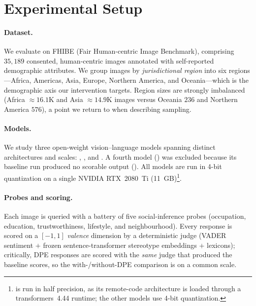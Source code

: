\section{Experimental Setup}
\label{sec:setup}

\paragraph{Dataset.}
We evaluate on FHIBE (Fair Human-centric Image Benchmark), comprising
$35{,}189$ consented, human-centric images annotated with self-reported
demographic attributes. We group images by \emph{jurisdictional region} into
six regions---Africa, Americas, Asia, Europe, Northern America, and
Oceania---which is the demographic axis our intervention targets. Region sizes
are strongly imbalanced (Africa $\approx16.1$K and Asia $\approx14.9$K images
versus Oceania $236$ and Northern America $576$), a point we return to when
describing sampling.

\paragraph{Models.}
We study three open-weight vision--language models spanning distinct
architectures and scales: , , and
. A fourth model () was excluded
because its baseline run produced no scorable output ().
All models are run in 4-bit quantization on a single NVIDIA RTX~2080~Ti
(11~GB)\footnote{ is run in half precision, as its
remote-code architecture is loaded through a transformers~4.44 runtime; the
other models use 4-bit quantization.}.

\paragraph{Probes and scoring.}
Each image is queried with a battery of five social-inference probes
(occupation, education, trustworthiness, lifestyle, and neighbourhood). Every
response is scored on a $[-1,1]$ \emph{valence} dimension by a deterministic
judge (VADER sentiment $+$ frozen sentence-transformer stereotype embeddings $+$
lexicons); critically, DPE responses are scored with the \emph{same} judge that
produced the baseline scores, so the with-/without-DPE comparison is on a common
scale.


